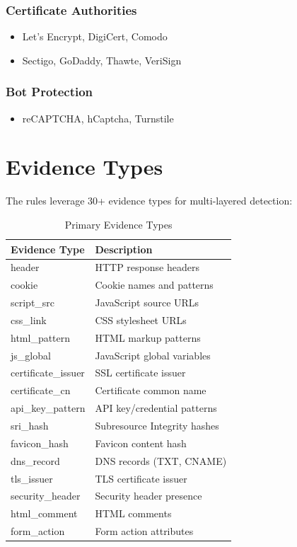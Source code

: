 \documentclass[11pt,a4paper,oneside]{article}
\begin{document}
\subsubsection{Certificate Authorities}
\begin{itemize}
    \item Let's Encrypt, DigiCert, Comodo
    \item Sectigo, GoDaddy, Thawte, VeriSign
\end{itemize}

\subsubsection{Bot Protection}
\begin{itemize}
    \item reCAPTCHA, hCaptcha, Turnstile
\end{itemize}

\section{Evidence Types}

The rules leverage 30+ evidence types for multi-layered detection:

\begin{table}[H]
\centering
\caption{Primary Evidence Types}
\label{tab:evidence_types}
\begin{tabular}{|l|p{6cm}|}
\hline
\textbf{Evidence Type} & \textbf{Description} \\
\hline
header & HTTP response headers \\
cookie & Cookie names and patterns \\
script\_src & JavaScript source URLs \\
css\_link & CSS stylesheet URLs \\
html\_pattern & HTML markup patterns \\
js\_global & JavaScript global variables \\
certificate\_issuer & SSL certificate issuer \\
certificate\_cn & Certificate common name \\
api\_key\_pattern & API key/credential patterns \\
sri\_hash & Subresource Integrity hashes \\
favicon\_hash & Favicon content hash \\
dns\_record & DNS records (TXT, CNAME) \\
tls\_issuer & TLS certificate issuer \\
security\_header & Security header presence \\
html\_comment & HTML comments \\
form\_action & Form action attributes \\
\hline
\end{tabular}
\end{table}
\end{document}
